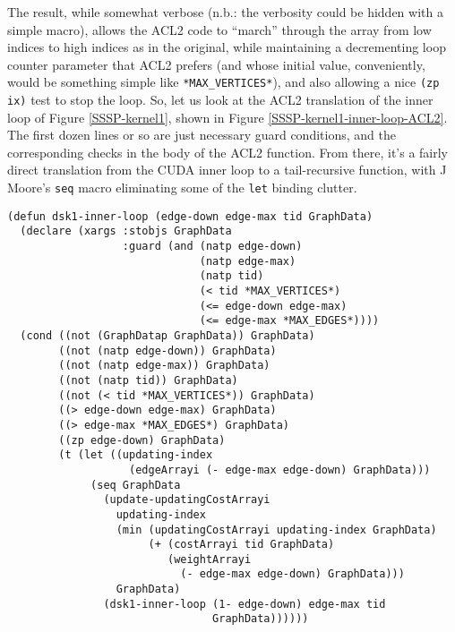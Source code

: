 \documentclass[copyright]{eptcs}
\begin{document}
The result, while somewhat verbose (n.b.: the verbosity could be
hidden with a simple macro), allows the ACL2 code to ``march''
through the array from low indices to high indices as in the original, 
while maintaining a decrementing loop counter parameter that ACL2 
prefers (and whose initial value, conveniently, would be something 
simple like \texttt{*MAX\_VERTICES*}), and also allowing a nice 
\texttt{(zp ix)} test to stop the loop.  So, let us look at the ACL2 
translation of the inner loop of Figure \ref{SSSP-kernel1}, shown in 
Figure \ref{SSSP-kernel1-inner-loop-ACL2}.  The first dozen lines or
so are just necessary guard conditions, and the corresponding checks
in the body of the ACL2 function.  From there, it's a fairly direct
translation from the CUDA inner loop to a tail-recursive function, 
with J Moore's \texttt{seq} macro eliminating some of the \texttt{let} 
binding clutter.

\begin{figure*}
\begin{verbatim}
(defun dsk1-inner-loop (edge-down edge-max tid GraphData)
  (declare (xargs :stobjs GraphData 
                  :guard (and (natp edge-down)
                              (natp edge-max)
                              (natp tid)
                              (< tid *MAX_VERTICES*)
                              (<= edge-down edge-max)
                              (<= edge-max *MAX_EDGES*))))
  (cond ((not (GraphDatap GraphData)) GraphData)
        ((not (natp edge-down)) GraphData)
        ((not (natp edge-max)) GraphData)
        ((not (natp tid)) GraphData)
        ((not (< tid *MAX_VERTICES*)) GraphData)
        ((> edge-down edge-max) GraphData)
        ((> edge-max *MAX_EDGES*) GraphData)
        ((zp edge-down) GraphData)
        (t (let ((updating-index 
                   (edgeArrayi (- edge-max edge-down) GraphData)))
             (seq GraphData 
               (update-updatingCostArrayi 
                 updating-index 
                 (min (updatingCostArrayi updating-index GraphData) 
                      (+ (costArrayi tid GraphData)
                         (weightArrayi 
                           (- edge-max edge-down) GraphData))) 
                 GraphData)
               (dsk1-inner-loop (1- edge-down) edge-max tid 
                                GraphData))))))
\end{verbatim}
\hrulefill
\caption{Single-Source Shortest Path Kernel inner loop in ACL2.}
\label{SSSP-kernel1-inner-loop-ACL2}
\end{figure*}
\end{document}
